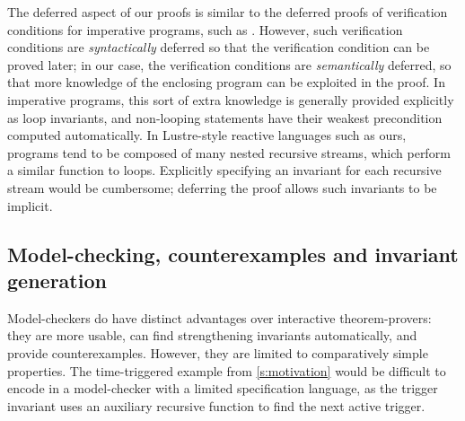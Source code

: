 


The deferred aspect of our proofs is similar to the deferred proofs of verification conditions for imperative programs, such as \cite{oconnor2019deferring}.
However, such verification conditions are \emph{syntactically} deferred so that the verification condition can be proved later; in our case, the verification conditions are \emph{semantically} deferred, so that more knowledge of the enclosing program can be exploited in the proof.
In imperative programs, this sort of extra knowledge is generally provided explicitly as loop invariants, and non-looping statements have their weakest precondition computed automatically.
In Lustre-style reactive languages such as ours, programs tend to be composed of many nested recursive streams, which perform a similar function to loops.
Explicitly specifying an invariant for each recursive stream would be cumbersome; deferring the proof allows such invariants to be implicit.

\subsection{Model-checking, counterexamples and invariant generation}
Model-checkers do have distinct advantages over interactive theorem-provers: they are more usable, can find strengthening invariants automatically, and provide counterexamples.
However, they are limited to comparatively simple properties.
The time-triggered example from \autoref{s:motivation} would be difficult to encode in a model-checker with a limited specification language, as the trigger invariant uses an auxiliary recursive function to find the next active trigger.

